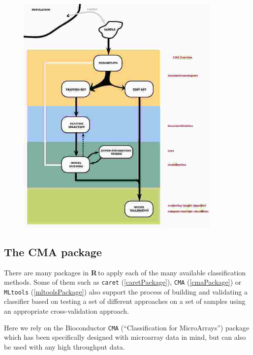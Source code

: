 \documentclass{article}\usepackage[]{graphicx}\usepackage[]{color}
\newcommand{\R}{\textbf{R}\,}
\begin{document}
\begin{figure}
\includegraphics[width=10cm]{images/biomarkerValidationScheme}
\label{validation}
\end{figure}

\subsection{The CMA package}

There are many packages in \R to apply each of the many available
classification methods.  Some of them such as \texttt{caret}
(\ref{caretPackage}), \texttt{CMA} (\ref{cmaPackage}) or
\texttt{MLtools} (\ref{mltoolsPackage}) also support the process of
building and validating a classifier based on testing a set of
different approaches on a set of samples using an appropriate
cross-validation approach. 

Here we rely on the Bioconductor \texttt{CMA} (``Classification for MicroArrays'') package which has been
specifically designed with microarray data in mind, but can also be used with any high throughput data.
\end{document}
